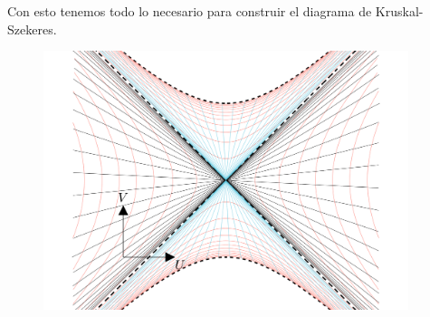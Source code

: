Con esto tenemos todo lo necesario para construir el diagrama de Kruskal-Szekeres.  
\begin{figure}[H]
    \begin{small}
        \begin{center}
            \includegraphics[width=0.95\textwidth]{AgujerosNegros/Schwarzschild/media/images/Kruskal_Szekeres_diagram_ManimCE_v0.19.0.png}
        \end{center}
        \caption{}
        \label{fig:}
    \end{small}
\end{figure}
